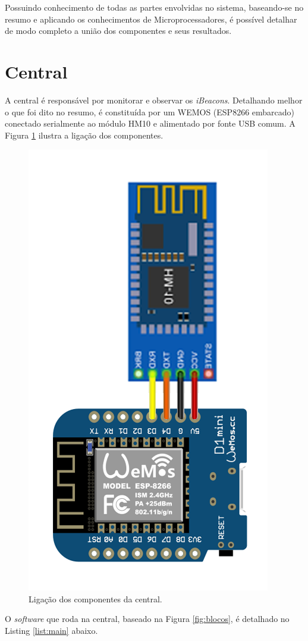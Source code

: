 \documentclass[
	12pt,				%
	openright,			%
	twoside,			%
	a4paper,			%
	english,			%
	french,				%
	spanish,			%
	brazil				%
	]{abntex2}
\begin{document}
Possuindo conhecimento de todas as partes envolvidas no sistema, baseando-se no resumo e aplicando os conhecimentos de Microprocessadores, é possível detalhar de modo completo a união dos componentes e seus resultados.

\section{Central}

A central é responsável por monitorar e observar os \textit{iBeacons}. Detalhando melhor o que foi dito no resumo, é constituída por um WEMOS (ESP8266 embarcado) conectado serialmente ao módulo HM10 e alimentado por fonte USB comum. A Figura \ref{fig:central} ilustra a ligação dos componentes.

\begin{figure}[h!]
    \centering
    \includegraphics[width=0.3\linewidth]{central}
    \caption{Ligação dos componentes da central.}
    \label{fig:central}
\end{figure}

O \textit{software} que roda na central, baseado na Figura \ref{fig:blocos}, é detalhado no Listing \ref{list:main} abaixo.
\end{document}
